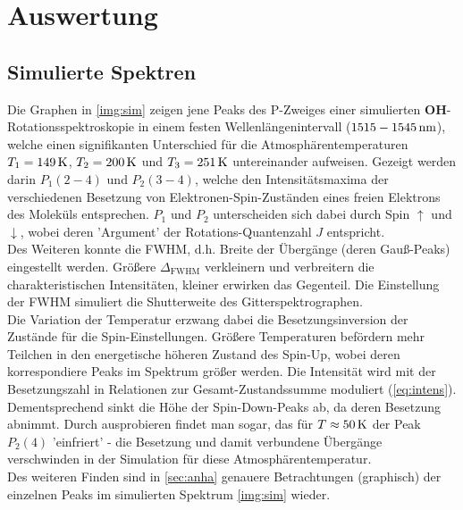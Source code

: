 \documentclass[numbers=noenddot,a4paper,notitlepage,twoside,BCOR15mm]{scrartcl}
\newcommand{\ix}[1]{_\text{#1}}
\newcommand{\fett}[1]{\textbf{#1}}
\begin{document}
	\clearpage
	\section{Auswertung}

		\subsection{Simulierte Spektren}

			Die Graphen in \autoref{img:sim} zeigen jene Peaks des P-Zweiges einer simulierten \fett{OH}-Rotationsspektroskopie in einem festen Wellenlängenintervall ($\unit[1515-1545]{nm}$), welche einen signifikanten Unterschied für die Atmosphärentemperaturen $T_1=\unit[149]{K}$, $T_2=\unit[200]{K}$ und $T_3=\unit[251]{K}$ untereinander aufweisen. Gezeigt werden darin $P\ix{1}(2-4)$ und $P\ix{2}(3-4)$, welche den Intensitätsmaxima der verschiedenen Besetzung von Elektronen-Spin-Zuständen eines freien Elektrons des Moleküls entsprechen. $P\ix{1}$ und $P\ix{2}$ unterscheiden sich dabei durch Spin $\uparrow$ und $\downarrow$, wobei deren 'Argument' der Rotations-Quantenzahl $J$ entspricht.\\
			Des Weiteren konnte die FWHM, d.h. Breite der Übergänge (deren Gauß-Peaks) eingestellt werden. Größere $\Delta\ix{FWHM}$ verkleinern und verbreitern die charakteristischen Intensitäten, kleiner erwirken das Gegenteil. Die Einstellung der FWHM simuliert die Shutterweite des Gitterspektrographen.\\
			Die Variation der Temperatur erzwang dabei die Besetzungsinversion der Zustände für die Spin-Einstellungen. Größere Temperaturen befördern mehr Teilchen in den energetische höheren Zustand des Spin-Up, wobei deren korrespondiere Peaks im Spektrum größer werden. Die Intensität wird mit der Besetzungszahl in Relationen zur Gesamt-Zustandssumme moduliert (\autoref{eq:intens}). Dementsprechend sinkt die Höhe der Spin-Down-Peaks ab, da deren Besetzung abnimmt. Durch ausprobieren findet man sogar, das für $T\approx\unit[50]{K}$ der Peak $P\ix{2}(4)$ 'einfriert' - die Besetzung und damit verbundene Übergänge verschwinden in der Simulation für diese Atmosphärentemperatur.\\
			Des weiteren Finden sind in \autoref{sec:anha} genauere Betrachtungen (graphisch) der einzelnen Peaks im simulierten Spektrum \autoref{img:sim} wieder.
\end{document}

